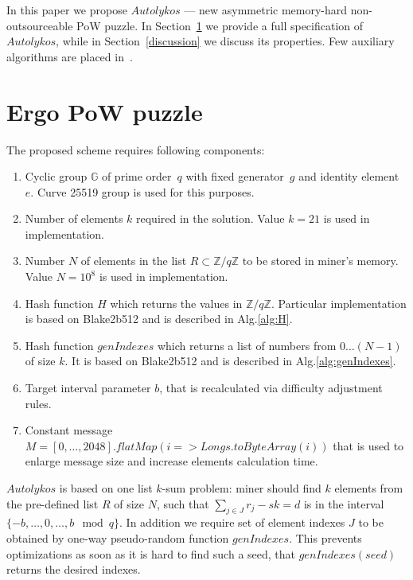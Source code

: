\documentclass[]{article}
\newcommand{\Name}{$Autolykos$}
\begin{document}
    In this paper we propose \Name{} --- new asymmetric memory-hard non-outsourceable PoW puzzle.
    In Section~\ref{puzzle} we provide a full
    specification of \Name, while in Section~\ref{discussion} we discuss its
    properties. Few auxiliary algorithms are placed in~.

    \section{Ergo PoW puzzle}
    \label{puzzle}

    The proposed scheme requires following components:
    \begin{enumerate}
        \item Cyclic group $\mathbb{G}$ of prime order~$q$ with fixed generator~$g$
        and identity element~$e$.
        Curve 25519 group is used for this purposes.
        \item Number of elements $k$ required in the solution. Value $k=21$ is used in
            implementation.
        \item Number $N$ of elements in the list
            $R\subset\mathbb{Z}/q\mathbb{Z}$ to be stored in miner's memory.
            Value $N=10^8$ is used in implementation.
        \item Hash function $H$ which returns the values in $\mathbb{Z}/q\mathbb{Z}$.
        Particular implementation is based on Blake2b512 and is described in Alg.\ref{alg:H}.
        \item Hash function $genIndexes$ which returns a list of numbers from
            $0\dots(N-1)$ of size $k$.
        It is based on Blake2b512 and is described in Alg.\ref{alg:genIndexes}.
        \item Target interval parameter $b$, that is recalculated via difficulty adjustment rules.
        \item Constant message $M=[0,\dots,2048].flatMap(i => Longs.toByteArray(i))$ that is used to enlarge message size and increase elements calculation time.
    \end{enumerate}

    \Name{} is based on one list $k$-sum problem: miner should find
    $k$ elements from the pre-defined list $R$ of size $N$, such that
    $\sum_{j \in J} r_{j} - sk = d$ is in the interval $\{-b,\dots,0,\dots,b\mod q\}$.
    In addition we require set of element indexes $J$ to be obtained
    by one-way pseudo-random function $genIndexes$. This prevents optimizations as
    soon as it is hard to find such a seed,
    that $genIndexes(seed)$ returns the desired indexes.
\end{document}
